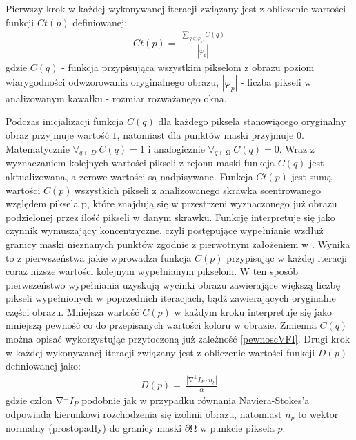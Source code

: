 \documentclass[12pt, twoside, openany]{report}
\theoremstyle{definition}
\begin{document}
Pierwszy krok w każdej wykonywanej iteracji związany jest z obliczenie wartości funkcji $Ct(p)$ definiowanej:
\begin{align}
Ct\left(p\right)=\ \frac{\sum_{q\in {\varphi }_{p'}}{C(q)}}{\left|{\varphi }_p\right|}
\label{confidenceTerm}
\end{align}
gdzie $C(q)$ - funkcja przypisująca wszystkim pikselom z obrazu poziom wiarygodności odwzorowania oryginalnego obrazu, $\left|{\varphi }_p\right|$ - liczba pikseli w analizowanym kawałku - rozmiar rozważanego okna. 
\par
Podczas inicjalizacji funkcja $C(q)$ dla każdego piksela stanowiącego oryginalny obraz przyjmuje wartość $1$, natomiast dla punktów maski przyjmuje 0. Matematycznie ${\forall }_{q\in D}\ C\left(q\right)=1$  i analogicznie ${\forall }_{q\in \mathrm{\Omega }}\ C\left(q\right)=0$. Wraz z wyznaczaniem kolejnych wartości pikseli z rejonu maski funkcja $C\left(q\right)$ jest aktualizowana, a zerowe wartości są nadpisywane. Funkcja $Ct\left(p\right)$ jest sumą wartości $C\left(p\right)\ $wszystkich pikseli z analizowanego skrawka scentrowanego względem piksela p, które znajdują się w przestrzeni wyznaczonego już obrazu podzielonej przez ilość pikseli w danym skrawku. Funkcję interpretuje się jako czynnik wymuszający koncentryczne, czyli postępujące wypełnianie wzdłuż granicy maski nieznanych punktów zgodnie z pierwotnym założeniem w \cite{efros1999texture}. Wynika to z pierwszeństwa jakie wprowadza funkcja $C\left(p\right)$ przypisując w każdej iteracji coraz niższe wartości kolejnym wypełnianym pikselom. W ten sposób pierwszeństwo wypełniania uzyskują wycinki obrazu zawierające większą liczbę pikseli wypełnionych w poprzednich iteracjach, bądź zawierających oryginalne części obrazu. Mniejsza wartość $C\left(p\right)$ w każdym kroku interpretuje się jako mniejszą pewność co do przepisanych wartości koloru w obrazie. Zmienna $C(q)$ można opisać wykorzystując przytoczoną już zależność \eqref{pewnoscVFI}.
Drugi krok w każdej wykonywanej iteracji związany jest z obliczenie wartości funkcji $D(p)$ definiowanej jako:
\begin{align}
D(p)=\ \frac{\left|{\mathrm{\nabla }}^{\bot }I_P\cdot n_p\right|}{\alpha }
\label{DataTerm}
\end{align}
gdzie człon ${\mathrm{\nabla }}^{\bot }I_P$ podobnie jak w przypadku równania Naviera-Stokes'a odpowiada kierunkowi rozchodzenia się izolinii obrazu, natomiast  $n_p$ to wektor normalny (prostopadły) do granicy maski $\partial \mathrm{\Omega }$ w punkcie piksela $p$.  
\end{document}
